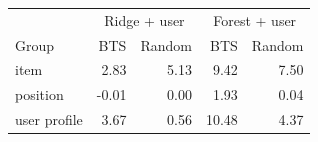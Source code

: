 \begin{tabular}{@{}lrrrr@{}}\toprule
 & \multicolumn{2}{c}{Ridge + user} & \multicolumn{2}{c}{Forest + user}\\
Group & BTS & Random & BTS & Random\\\midrule
item & 2.83 & 5.13 & 9.42 & 7.50 \\
position & -0.01 & 0.00 & 1.93 & 0.04 \\
user profile & 3.67 & 0.56 & 10.48 & 4.37 \\
\bottomrule\end{tabular}
